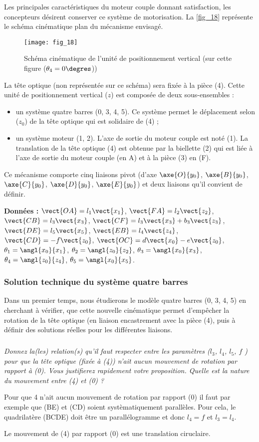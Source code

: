 Les principales caractéristiques du moteur couple donnant satisfaction, les concepteurs désirent conserver ce
système de motorisation. La \autoref{fig_18} représente le schéma cinématique plan du mécanisme envisagé.

\begin{figure}[H]
\centering
\texttt{[image: fig\_18]}
\caption{\label{fig_18} Schéma cinématique de l'unité de positionnement vertical (sur cette figure ($\theta_4 = 0\degres$))}
\end{figure}

La tête optique (non représentée sur ce schéma) sera fixée à la pièce (4).
Cette unité de positionnement vertical ($z$) est composée de deux sous-ensembles :
\begin{itemize}
\item un système quatre barres (0, 3, 4, 5). Ce système permet le déplacement selon ($z_0$) de la tête optique qui est solidaire de (4) ;
\item un système moteur (1, 2). L’axe de sortie du moteur couple est noté (1). La translation de la tête optique (4) est obtenue par la biellette (2) qui est liée à l’axe de sortie du moteur couple (en A) et à la pièce (3) en (F).
\end{itemize}
Ce mécanisme comporte cinq liaisons pivot (d’axe $\axe{O}{y_0}$, $\axe{B}{y_0}$, $\axe{C}{y_0}$, $\axe{D}{y_0}$, $\axe{E}{y_0}$) et deux liaisons qu’il convient de définir.

\textbf{Données : }
$\vect{OA}=l_1\vect{x_1}$, 
$\vect{FA}=l_2\vect{z_2}$, 
$\vect{CB}=l_3\vect{x_3}$, 
$\vect{CF}=l_3\vect{x_3} +b_3 \vect{z_3} $, 
$\vect{DE}=l_5\vect{x_5}$, 
$\vect{EB}=l_4\vect{z_4}$, 
$\vect{CD}=-f\vect{z_0}$, 
$\vect{OC}=d\vect{x_0}-e\vect{z_0}$, 
$\theta_1 = \angl{x_0}{x_1}$,
$\theta_2 = \angl{z_0}{z_2}$,
$\theta_3 = \angl{x_0}{x_3}$,
$\theta_4 = \angl{z_0}{z_4}$,
$\theta_5 = \angl{x_0}{x_5}$.
\fi

\subsubsection{Solution technique du système quatre barres}
\ifprof
\else
Dans un premier temps, nous étudierons le modèle quatre barres (0, 3, 4, 5) en cherchant à vérifier, que
cette nouvelle cinématique permet d’empêcher la rotation de la tête optique (en liaison encastrement avec
la pièce (4), puis à définir des solutions réelles pour les différentes liaisons.
\fi

\subparagraph{\label{q_16}}\textit{Donnez la(les) relation(s) qu’il faut respecter entre les paramètres ($l_3$, $l_4$, $l_5$, $f$ ) pour que la tête
optique (fixée à (4)) n’ait aucun mouvement de rotation par rapport à (0). Vous justifierez
rapidement votre proposition.
Quelle est la nature du mouvement entre (4) et (0) ?}
\ifprof
\begin{corrige}
Pour que 4 n'ait aucun mouvement de rotation par rapport (0) il faut par exemple que (BE) et (CD) soient systèmatiquement parallèles. Pour cela, le quadrilatère (BCDE) doit être un parallélogramme et donc $l_4=f$ et $l_3=l_4$.

Le mouvement de (4) par rapport (0) est une translation ciruclaire. 
\end{corrige}
\else
\fi

